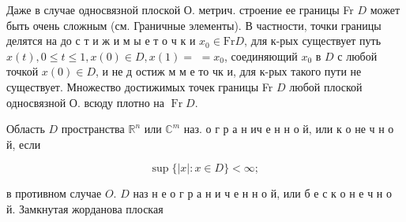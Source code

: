 \documentclass[10pt]{article}
\begin{document}
Даже в случае односвязной плоской О. метрич. строение ее границы Fr $D$ может быть очень сложным (см. Граничные элементы). В частности, точки границы делятся на до с т и ж и м ы е т о ч к и $x_{0} \in \mathrm{Fr} D$, для к-рых существует путь $x(t), 0 \leqslant t \leqslant 1, x(0) \in D, x(1)=$ $=x_{0}$, соединяющий $x_{0}$ в $D$ с любой точкой $x(0) \in D$, и не д остиж м м е то чк и, для к-рых такого пути не существует. Множество достижимых точек границы Fr $D$ любой плоской односвязной О. всюду плотно на $\operatorname{Fr} D$.



Область $D$ пространства $\mathbb{R}^{n}$ или $\mathbb{C}^{m}$ наз. о г р а н ич е н н о й, или к о не ч н о й, если



\[

\sup \{|x|: x \in D\}<\infty \text {; }

\]



в противном случае $O$. $D$ наз н е о г р а н и ч е н н о й, или б е с к о н е ч н о й. Замкнутая жорданова плоская
\end{document}
